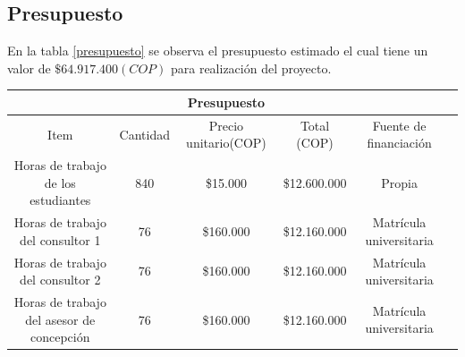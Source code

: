 \newpage
\begin{landscape}
\section{Presupuesto}
En la tabla \ref{presupuesto} se observa el  presupuesto estimado el cual tiene un valor de $\$64.917.400 (COP)$ para realización del proyecto. 


\begin{table}[H]
    
    \begin{tabular}{|c|c|c|c|c|c|}
    \hline
    \multicolumn{5}{|c|}{Presupuesto} \\ \hline
       Item& Cantidad& Precio unitario(COP)& Total (COP) & Fuente de financiación \\ \hline
        Horas de trabajo de los estudiantes& 840&  \$15.000&  \$12.600.000 & Propia\\ \hline
        Horas de trabajo del consultor 1& 76&  \$160.000&  \$12.160.000 & Matrícula universitaria \\ \hline
        
         Horas de trabajo del consultor 2 & 76&  \$160.000&  \$12.160.000 & Matrícula universitaria \\ \hline
        Horas de trabajo del asesor de concepción& 76& \$160.000& \$12.160.000 & Matrícula universitaria  \\ \hline
       

\end{tabular}
\end{table}
\end{landscape}
